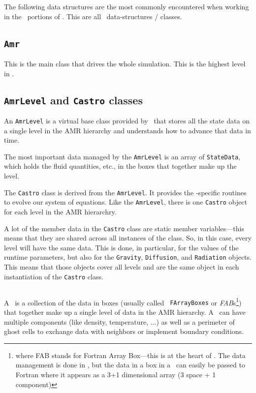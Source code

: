 The following data structures are the most commonly encountered when
working in the \cpp\ portions of \castro.  This are all
\boxlib\ data-structures / classes.

\subsection{{\tt Amr}}

This is the main class that drives the whole simulation.  This is 
the highest level in \castro.


\subsection{{\tt AmrLevel} and {\tt Castro} classes}

An {\tt AmrLevel} is a virtual base class provided by \boxlib\ that
stores all the state data on a single level in the AMR hierarchy and
understands how to advance that data in time.

The most important data managed by the {\tt AmrLevel} is an array of
{\tt StateData}, which holds the fluid quantities, etc., in the boxes
that together make up the level.

The {\tt Castro} class is derived from the {\tt AmrLevel}.  It provides
the \castro-specific routines to evolve our system of equations.  Like
the {\tt AmrLevel}, there is one {\tt Castro} object for each level in the
AMR hierarchry.

A lot of the member data in the {\tt Castro} class are static member
variables---this means that they are shared across all instances of
the class.  So, in this case, every level will have the same data.
This is done, in particular, for the values of the runtime parameters,
but also for the {\tt Gravity}, {\tt Diffusion}, and {\tt Radiation}
objects.  This means that those objects cover all levels and are the
same object in each instantiation of the {\tt Castro} class.


\subsection{\multifab}

A \multifab\ is a collection of the data in boxes (usually called {\tt
  FArrayBoxes} or {\em FAB}s\footnote{where FAB stands for Fortran
  Array Box---this is at the heart of \boxlib.  The data management is
  done in \cpp, but the data in a box in a \multifab\ can easily be
  passed to Fortran where it appears as a 3+1 dimensional array (3
  space + 1 component)}) that together make up a single level of data
in the AMR hierarchy.  A \multifab\ can have multiple components (like
density, temperature, ...) as well as a perimeter of ghost cells to
exchange data with neighbors or implement boundary conditions.  

